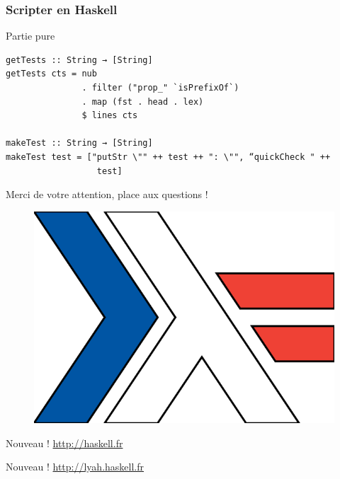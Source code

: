 \documentclass[10pt]{beamer}
\begin{document}
\begin{frame}[fragile]
\frametitle{Scripter en Haskell}
\begin{block}{Partie pure}
\begin{verbatim}
getTests :: String → [String]
getTests cts = nub
               . filter ("prop_" `isPrefixOf`)
               . map (fst . head . lex)
               $ lines cts

makeTest :: String → [String]
makeTest test = ["putStr \"" ++ test ++ ": \"", “quickCheck " ++
                  test]
\end{verbatim}
\end{block}
\end{frame}



\begin{frame}
\centerline{Merci de votre attention, place aux questions !}

\begin{figure}
\includegraphics[scale=0.4]{haskell_fr_logo.png}
\end{figure}

\centerline{Nouveau ! \url{http://haskell.fr}}

\centerline{Nouveau ! \url{http://lyah.haskell.fr}}
\end{frame}
\end{document}
